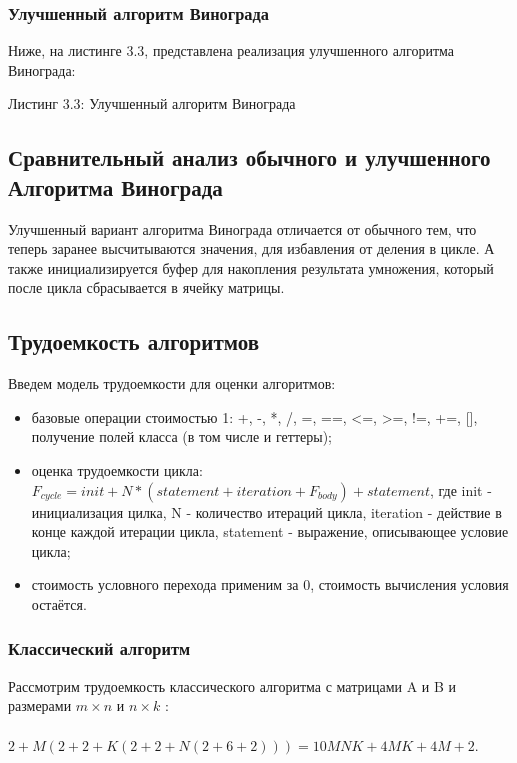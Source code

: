 \documentclass[12pt,a4paper]{article}
\numberwithin{equation}{section}
\begin{document}
\subsubsection{Улучшенный алгоритм Винограда}
\qquad Ниже, на листинге 3.3,  представлена реализация улучшенного алгоритма Винограда:
\begin{center}
	Листинг 3.3: Улучшенный алгоритм Винограда
		
\end{center}
\clearpage

\subsection{Сравнительный анализ обычного и улучшенного Алгоритма Винограда}
\qquad Улучшенный вариант алгоритма Винограда отличается от обычного тем, что теперь заранее высчитываются значения, для избавления от деления в цикле. А также инициализируется буфер для накопления результата умножения, который после цикла сбрасывается в ячейку матрицы.

\subsection{Трудоемкость алгоритмов}
\qquad Введем модель трудоемкости для оценки алгоритмов:\\
\begin{itemize}
\item базовые операции стоимостью 1: +, -, *, /, =, ==, <=, >=, !=, +=, [], получение полей класса (в том числе и геттеры);\\
\item оценка трудоемкости цикла: $F_{cycle} = init +  N*(statement + iteration + F_{body}) + statement$, где init - инициализация цилка, N - количество итераций цикла, iteration - действие в конце каждой итерации цикла, statement - выражение, описывающее условие цикла;\\
\item стоимость условного перехода применим за 0, стоимость вычисления условия остаётся.\\
\end{itemize}

\subsubsection{Классический алгоритм}
Рассмотрим трудоемкость классического алгоритма с матрицами A и B и размерами $m\times n$ и $n\times k$ : \\\\
$2 + M(2 + 2 + K(2 + 2 + N(2 + 6 + 2))) = 
10MNK + 4MK + 4M + 2 .
$
\end{document}
